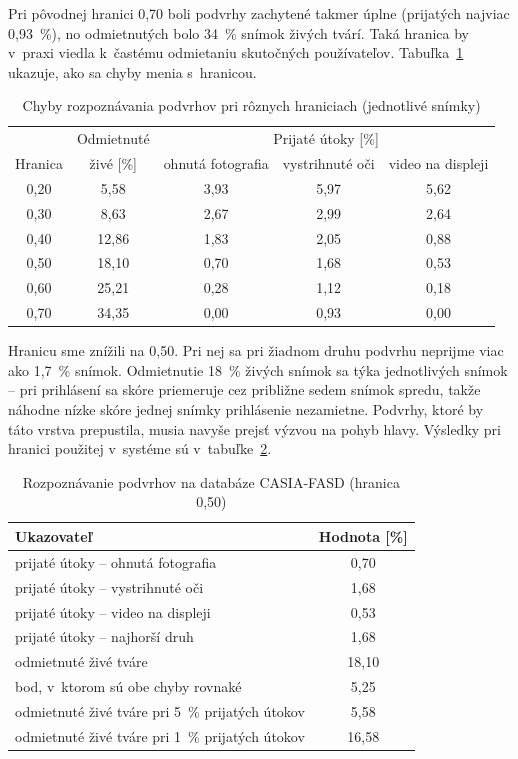 \documentclass[12pt,a4paper,oneside]{report}
\begin{document}
Pri pôvodnej hranici 0,70 boli podvrhy zachytené takmer úplne (prijatých najviac
0,93~\%), no odmietnutých bolo 34~\% snímok živých tvárí. Taká hranica by v~praxi viedla
k~častému odmietaniu skutočných používateľov. Tabuľka~\ref{tab:prah} ukazuje, ako sa
chyby menia s~hranicou.

\begin{table}[H]
  \centering
  \caption{Chyby rozpoznávania podvrhov pri rôznych hraniciach (jednotlivé snímky)}
  \label{tab:prah}
  \small
  \begin{tabular}{@{}ccccc@{}}
    \toprule
    & Odmietnuté & \multicolumn{3}{c}{Prijaté útoky [\%]} \\
    Hranica & živé [\%] & ohnutá fotografia & vystrihnuté oči & video na displeji \\
    \midrule
    0,20 & 5,58 & 3,93 & 5,97 & 5,62 \\
    0,30 & 8,63 & 2,67 & 2,99 & 2,64 \\
    0,40 & 12,86 & 1,83 & 2,05 & 0,88 \\
    0,50 & 18,10 & 0,70 & 1,68 & 0,53 \\
    0,60 & 25,21 & 0,28 & 1,12 & 0,18 \\
    0,70 & 34,35 & 0,00 & 0,93 & 0,00 \\
    \bottomrule
  \end{tabular}
\end{table}

Hranicu sme znížili na 0,50. Pri nej sa pri žiadnom druhu podvrhu neprijme viac ako
1,7~\% snímok. Odmietnutie 18~\% živých snímok sa týka jednotlivých snímok -- pri
prihlásení sa skóre priemeruje cez približne sedem snímok spredu, takže náhodne nízke
skóre jednej snímky prihlásenie nezamietne. Podvrhy, ktoré by táto vrstva prepustila,
musia navyše prejsť výzvou na pohyb hlavy. Výsledky pri hranici použitej v~systéme sú
v~tabuľke~\ref{tab:pad}.

\begin{table}[H]
  \centering
  \caption{Rozpoznávanie podvrhov na databáze CASIA-FASD (hranica 0,50)}
  \label{tab:pad}
  \begin{tabular}{@{}lc@{}}
    \toprule
    Ukazovateľ & Hodnota [\%] \\
    \midrule
    prijaté útoky -- ohnutá fotografia & 0,70 \\
    prijaté útoky -- vystrihnuté oči & 1,68 \\
    prijaté útoky -- video na displeji & 0,53 \\
    prijaté útoky -- najhorší druh & 1,68 \\
    odmietnuté živé tváre & 18,10 \\
    bod, v~ktorom sú obe chyby rovnaké & 5,25 \\
    odmietnuté živé tváre pri 5~\% prijatých útokov & 5,58 \\
    odmietnuté živé tváre pri 1~\% prijatých útokov & 16,58 \\
    \bottomrule
  \end{tabular}
\end{table}
\end{document}
